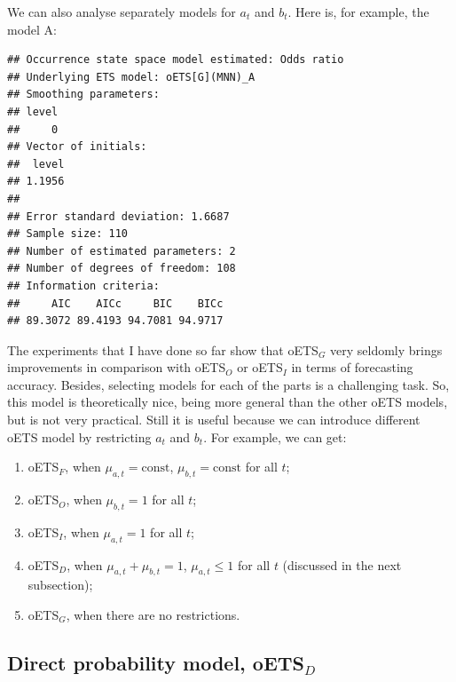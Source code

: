\documentclass[
]{book}
\newenvironment{Shaded}{\begin{snugshade}}{\end{snugshade}}
\newcommand{\NormalTok}[1]{#1}
\newcommand{\SpecialCharTok}[1]{\textcolor[rgb]{0.00,0.00,0.00}{#1}}
\providecommand{\tightlist}{%
  \setlength{\itemsep}{0pt}\setlength{\parskip}{0pt}}
\theoremstyle{definition}
\theoremstyle{definition}
\theoremstyle{definition}
\theoremstyle{definition}
\theoremstyle{remark}
\begin{document}
We can also analyse separately models for \(a_t\) and \(b_t\). Here is, for example, the model A:

\begin{Shaded}
\end{Shaded}

\begin{verbatim}
## Occurrence state space model estimated: Odds ratio
## Underlying ETS model: oETS[G](MNN)_A
## Smoothing parameters:
## level 
##     0 
## Vector of initials:
##  level 
## 1.1956 
## 
## Error standard deviation: 1.6687
## Sample size: 110
## Number of estimated parameters: 2
## Number of degrees of freedom: 108
## Information criteria: 
##     AIC    AICc     BIC    BICc 
## 89.3072 89.4193 94.7081 94.9717
\end{verbatim}

The experiments that I have done so far show that oETS\(_G\) very seldomly brings improvements in comparison with oETS\(_O\) or oETS\(_I\) in terms of forecasting accuracy. Besides, selecting models for each of the parts is a challenging task. So, this model is theoretically nice, being more general than the other oETS models, but is not very practical. Still it is useful because we can introduce different oETS model by restricting \(a_t\) and \(b_t\). For example, we can get:

\begin{enumerate}
\def\labelenumi{\arabic{enumi}.}
\tightlist
\item
  oETS\(_F\), when \(\mu_{a,t} = \text{const}\), \(\mu_{b,t} = \text{const}\) for all \(t\);
\item
  oETS\(_O\), when \(\mu_{b,t} = 1\) for all \(t\);
\item
  oETS\(_I\), when \(\mu_{a,t} = 1\) for all \(t\);
\item
  oETS\(_D\), when \(\mu_{a,t} + \mu_{b,t} = 1\), \(\mu_{a,t} \leq 1\) for all \(t\) (discussed in the next subsection);
\item
  oETS\(_G\), when there are no restrictions.
\end{enumerate}

\hypertarget{direct-probability-model-oets_d}{%
\subsection{\texorpdfstring{Direct probability model, oETS\(_D\)}{Direct probability model, oETS\_D}}\label{direct-probability-model-oets_d}}
\end{document}
